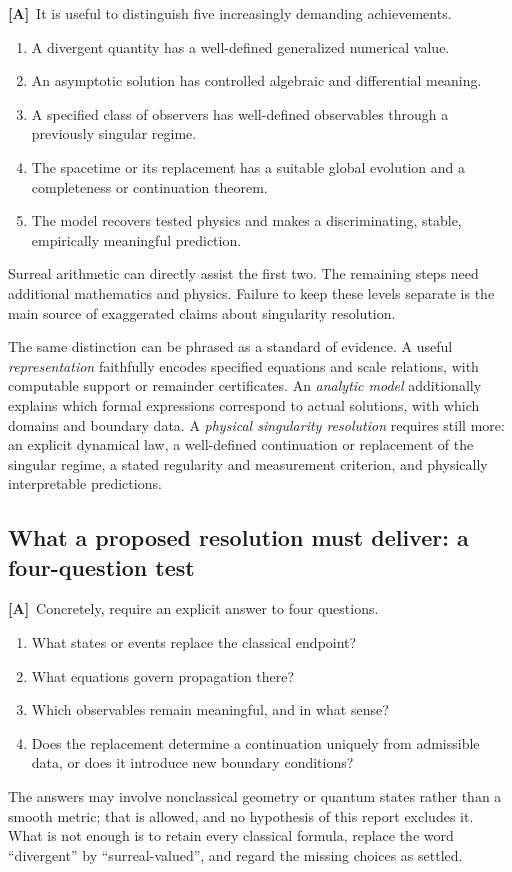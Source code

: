 \documentclass[11pt,letterpaper]{article}
\numberwithin{equation}{section}
\theoremstyle{definition}
\theoremstyle{remark}
\newcommand{\TA}{\textcolor{TierA}{\textsf{\bfseries[A]}}}
\begin{document}
\TA\ It is useful to distinguish five increasingly demanding achievements.
\begin{enumerate}[label=\textup{(\arabic*)},leftmargin=2.4em]
\item A divergent quantity has a well-defined generalized numerical value.
\item An asymptotic solution has controlled algebraic and differential meaning.
\item A specified class of observers has well-defined observables through a
previously singular regime.
\item The spacetime or its replacement has a suitable global evolution and a
completeness or continuation theorem.
\item The model recovers tested physics and makes a discriminating, stable,
empirically meaningful prediction.
\end{enumerate}
Surreal arithmetic can directly assist the first two. The remaining steps need
additional mathematics and physics. Failure to keep these levels separate is
the main source of exaggerated claims about singularity resolution.

The same distinction can be phrased as a standard of evidence. A useful
\emph{representation} faithfully encodes specified equations and scale
relations, with computable support or remainder certificates. An \emph{analytic
model} additionally explains which formal expressions correspond to actual
solutions, with which domains and boundary data. A \emph{physical singularity
resolution} requires still more: an explicit dynamical law, a well-defined
continuation or replacement of the singular regime, a stated regularity and
measurement criterion, and physically interpretable predictions.

\subsection{What a proposed resolution must deliver: a four-question test}
\label{phys:sub:fourquestions}

\TA\ Concretely, require an explicit answer to four questions.
\begin{enumerate}[label=\textup{(Q\arabic*)},leftmargin=3.1em]
\item What states or events replace the classical endpoint?
\item What equations govern propagation there?
\item Which observables remain meaningful, and in what sense?
\item Does the replacement determine a continuation uniquely from admissible
data, or does it introduce new boundary conditions?
\end{enumerate}
The answers may involve nonclassical geometry or quantum states rather than a
smooth metric; that is allowed, and no hypothesis of this report excludes it.
What is not enough is to retain every classical formula, replace the word
``divergent'' by ``surreal-valued'', and regard the missing choices as settled.
\end{document}
